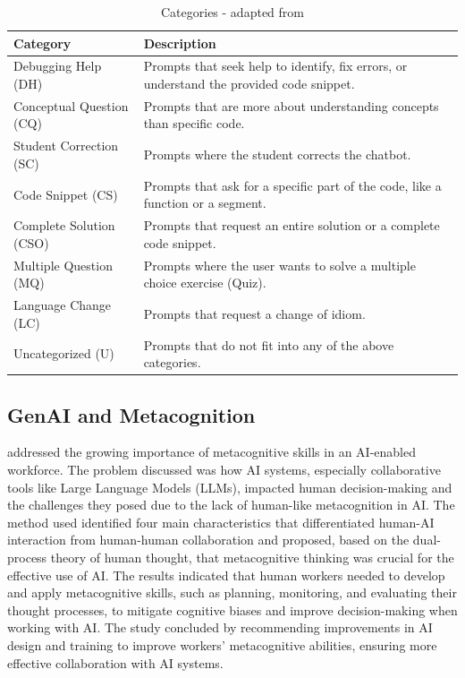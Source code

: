 \documentclass[a4paper,twoside]{article}
\begin{document}
\begin{table}[htbp]
  \caption{Categories - adapted from \cite{Ghimire24}}
  \begin{center}
    \renewcommand{\arraystretch}{1.6} %
    \begin{tabular}{p{4cm} p{12cm}} %
      \hline
      \textbf{Category} & \textbf{Description} \\
      \hline
      Debugging Help (DH) & Prompts that seek help to identify, fix errors, or understand the provided code snippet. \\
      Conceptual Question (CQ) & Prompts that are more about understanding concepts than specific code. \\
      Student Correction (SC) & Prompts where the student corrects the chatbot. \\
      Code Snippet  (CS) & Prompts that ask for a specific part of the code, like a function or a segment. \\
      Complete Solution (CSO) & Prompts that request an entire solution or a complete code snippet. \\
      Multiple Question (MQ) & Prompts where the user wants to solve a multiple choice exercise (Quiz). \\
      Language Change (LC) & Prompts that request a change of idiom. \\
      Uncategorized (U) & Prompts that do not fit into any of the above categories. \\
      \hline
    \end{tabular}
    \label{tab:categories}
  \end{center}
\end{table}

\subsection{GenAI and Metacognition}

\cite{Sidra24} addressed the growing importance of metacognitive skills in an
AI-enabled workforce. The problem discussed was how AI systems, especially
collaborative tools like Large Language Models (LLMs), impacted human
decision-making and the challenges they posed due to the lack of human-like
metacognition in AI. The method used identified four main characteristics that
differentiated human-AI interaction from human-human collaboration and proposed,
based on the dual-process theory of human thought, that metacognitive thinking
was crucial for the effective use of AI. The results indicated that human
workers needed to develop and apply metacognitive skills, such as planning,
monitoring, and evaluating their thought processes, to mitigate cognitive biases
and improve decision-making when working with AI. The study concluded by
recommending improvements in AI design and training to improve workers'
metacognitive abilities, ensuring more effective collaboration with AI systems.
\end{document}
